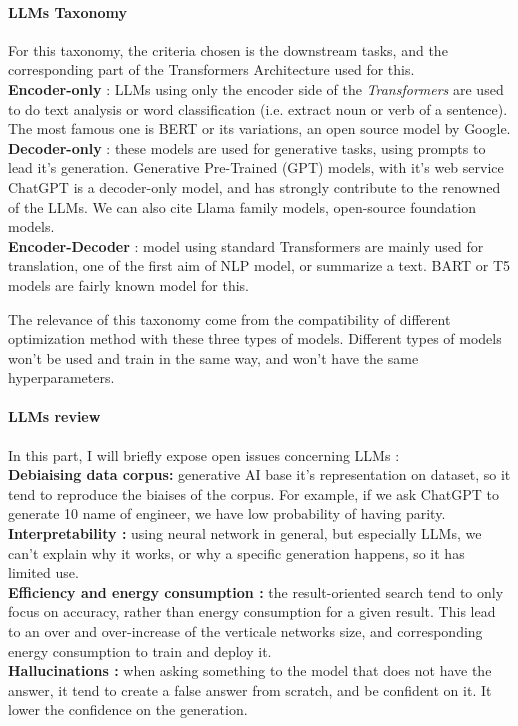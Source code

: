\paragraph{LLMs Taxonomy}
For this taxonomy, the criteria chosen is the downstream tasks, and the corresponding part of the Transformers Architecture used for this.\\
\textbf{Encoder-only} : LLMs using only the encoder side of the \textit{Transformers} are used to do text analysis or word classification (i.e. extract noun or verb of a sentence). The most famous one is BERT\cite{devlin_bert_2019} or its variations, an open source model by Google.\\
\textbf{Decoder-only} : these models are used for generative tasks, using prompts to lead it's generation. Generative Pre-Trained (GPT) models, with it's web service ChatGPT \cite{openai_gpt-4_2024} is a decoder-only model, and has strongly contribute to the renowned of the LLMs. We can also cite Llama \cite{grattafiori_llama_2024} family models, open-source foundation models.\\
\textbf{Encoder-Decoder} : model using standard Transformers are mainly used for translation, one of the first aim of NLP model, or summarize a text. BART\cite{lewis_bart_2020} or T5\cite{raffel_exploring_2020} models are fairly known model for this.

The relevance of this taxonomy come from the compatibility of different optimization method with these three types of models. Different types of models won't be used and train in the same way, and won't have the same hyperparameters. 

\paragraph{LLMs review}
In this part, I will briefly expose open issues concerning LLMs : \\
\textbf{Debiaising data corpus:} generative AI base it's representation on dataset, so it tend to reproduce the biaises of the corpus. For example, if we ask ChatGPT to generate 10 name of engineer, we have low probability of having parity.\\
\textbf{Interpretability :} using neural network in general, but especially LLMs, we can't explain why it works, or why a specific generation happens, so it has limited use.\\
\textbf{Efficiency and energy consumption :} the result-oriented search tend to only focus on accuracy, rather than energy consumption for a given result. This lead to an over and over-increase of the verticale networks size, and corresponding energy consumption to train and deploy it.\\
\textbf{Hallucinations\cite{bang_multitask_2023} :} when asking something to the model that does not have the answer, it tend to create a false answer from scratch, and be confident on it. It lower the confidence on the generation. 


